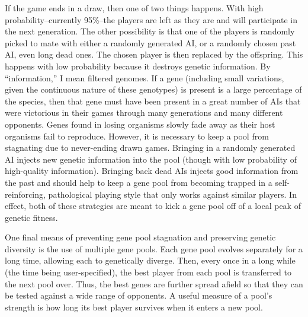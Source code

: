 \documentclass[letter]{article}
\renewcommand\_{\textunderscore\allowbreak}
\begin{document}
If the game ends in  a draw, then one of two things happens. With high probability--currently 95\%--the players are left as they are and will participate in the next generation. The other possibility is that one of the players is randomly picked to mate with either a randomly generated AI, or a randomly chosen past AI, even long dead ones. The chosen player is then replaced by the offspring. This happens with low probability because it destroys genetic information. By ``information,'' I mean filtered genomes. If a gene (including small variations, given the continuous nature of these genotypes) is present is a large percentage of the species, then that gene must have been present in a great number of AIs that were victorious in their games through many generations and many different opponents. Genes found in losing organisms slowly fade away as their host organisms fail to reproduce. However, it is necessary to keep a pool from stagnating due to never-ending drawn games. Bringing in a randomly generated AI injects new genetic information into the pool (though with low probability of high-quality information). Bringing back dead AIs injects good information from the past and should help to keep a gene pool from becoming trapped in a self-reinforcing, pathological playing style that only works against similar players. In effect, both of these strategies are meant to kick a gene pool off of a local peak of genetic fitness.

One final means of preventing gene pool stagnation and preserving genetic diversity is the use of multiple gene pools. Each gene pool evolves separately for a long time, allowing each to genetically diverge. Then, every once in a long while (the time being user-specified), the best player from each pool is transferred to the next pool over. Thus, the best genes are further spread afield so that they can be tested against a wide range of opponents. A useful measure of a pool's strength is how long its best player survives when it enters a new pool.
\end{document}
